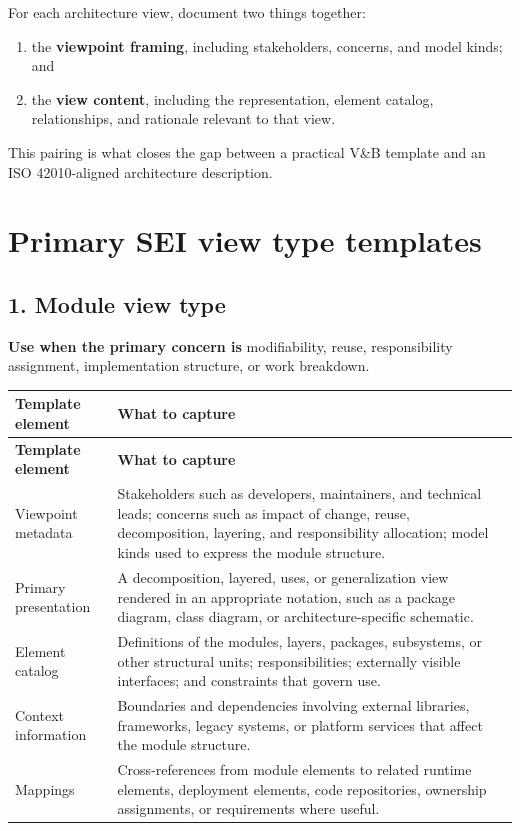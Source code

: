\documentclass[11pt]{article}
\begin{document}
For each architecture view, document two things together:
\begin{enumerate}[leftmargin=1.5em]
    \item the \textbf{viewpoint framing}, including stakeholders, concerns, and model kinds; and
    \item the \textbf{view content}, including the representation, element catalog, relationships, and rationale relevant to that view.
\end{enumerate}

This pairing is what closes the gap between a practical V\&B template and an ISO 42010-aligned architecture description.

\section{Primary SEI view type templates}

\subsection{1. Module view type}

\textbf{Use when the primary concern is} modifiability, reuse, responsibility assignment, implementation structure, or work breakdown.

\begin{longtable}{@{}P{0.26\textwidth}P{0.69\textwidth}@{}}
\textbf{Template element} & \textbf{What to capture} \\
\toprule
\endfirsthead
{}
\textbf{Template element} & \textbf{What to capture} \\
\toprule
\endhead
Viewpoint metadata & Stakeholders such as developers, maintainers, and technical leads; concerns such as impact of change, reuse, decomposition, layering, and responsibility allocation; model kinds used to express the module structure. \\
Primary presentation & A decomposition, layered, uses, or generalization view rendered in an appropriate notation, such as a package diagram, class diagram, or architecture-specific schematic. \\
Element catalog & Definitions of the modules, layers, packages, subsystems, or other structural units; responsibilities; externally visible interfaces; and constraints that govern use. \\
Context information & Boundaries and dependencies involving external libraries, frameworks, legacy systems, or platform services that affect the module structure. \\
Mappings & Cross-references from module elements to related runtime elements, deployment elements, code repositories, ownership assignments, or requirements where useful. \\
\bottomrule
\end{longtable}
\end{document}
